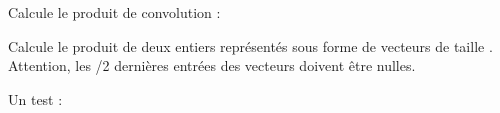 \begin{maplegroup}
\begin{flushleft}
Calcule le produit de convolution :
\end{flushleft}

\end{maplegroup}
\begin{maplegroup}
\begin{mapleinput}
\end{mapleinput}

\end{maplegroup}
\begin{maplegroup}
\begin{flushleft}
Calcule le produit de deux entiers représentés sous forme de vecteurs
de taille 
.
Attention, les 
/2 dernières entrées des vecteurs doivent être nulles.
\end{flushleft}

\end{maplegroup}
\begin{maplegroup}
\begin{mapleinput}
\end{mapleinput}

\end{maplegroup}
\begin{maplegroup}
\begin{flushleft}
Un test :
\end{flushleft}

\end{maplegroup}

